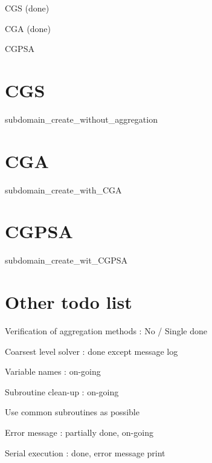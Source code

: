 
\begin{DoxyItemize}
\item C\+GS (done)
\item C\+GA (done)
\item C\+G\+P\+SA
\end{DoxyItemize}

\section*{C\+GS}


\begin{DoxyItemize}
\item subdomain\+\_\+create\+\_\+without\+\_\+aggregation
\end{DoxyItemize}

\section*{C\+GA}


\begin{DoxyItemize}
\item subdomain\+\_\+create\+\_\+with\+\_\+\+C\+GA
\end{DoxyItemize}

\section*{C\+G\+P\+SA}


\begin{DoxyItemize}
\item subdomain\+\_\+create\+\_\+wit\+\_\+\+C\+G\+P\+SA
\end{DoxyItemize}

\section*{Other todo list}


\begin{DoxyItemize}
\item Verification of aggregation methods \+: No / Single done
\item Coarsest level solver \+: done except message log
\item Variable names \+: on-\/going
\item Subroutine clean-\/up \+: on-\/going
\item Use common subroutines as possible
\item Error message \+: partially done, on-\/going
\item Serial execution \+: done, error message print 
\end{DoxyItemize}